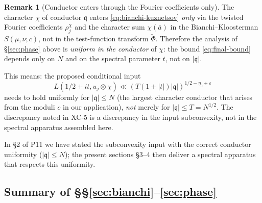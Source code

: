\documentclass[11pt]{article}
\theoremstyle{definition}
\newtheorem{remark}[theorem]{Remark}
\begin{document}
\begin{remark}[Conductor enters through the Fourier coefficients only]\label{rem:conductor-uniformity}
The character $\chi$ of conductor $\mathfrak{q}$ enters \eqref{eq:bianchi-kuznetsov} \emph{only} via the twisted Fourier coefficients $\rho_j^\chi$ and the character sum $\chi(\bar a)$ in the Bianchi--Kloosterman $S(\mu,\nu;c)$, not in the test-function transform $\check\Phi$. Therefore the analysis of \S\ref{sec:phase} above is \emph{uniform in the conductor} of $\chi$: the bound \eqref{eq:final-bound} depends only on $N$ and on the spectral parameter $t$, not on $|\mathfrak{q}|$.

This means: the proposed conditional input
\[
   L(1/2+it, u_j\otimes\chi) \ll (T(1+|t|)|\mathfrak{q}|)^{1/2-\eta_0+\varepsilon}
\]
needs to hold uniformly for $|\mathfrak{q}| \le N$ (the largest character conductor that arises from the moduli $c$ in our application), \emph{not} merely for $|\mathfrak{q}| \le T = N^{1/2}$. The discrepancy noted in XC-5 is a discrepancy in the input subconvexity, not in the spectral apparatus assembled here.

In \S2 of P11 we have stated the subconvexity input with the correct conductor uniformity ($|\mathfrak{q}| \le N$); the present sections \S3--4 then deliver a spectral apparatus that respects this uniformity.
\end{remark}

\medskip
\subsection{Summary of \S\S\ref{sec:bianchi}--\ref{sec:phase}}\label{ssec:summary}
\end{document}
